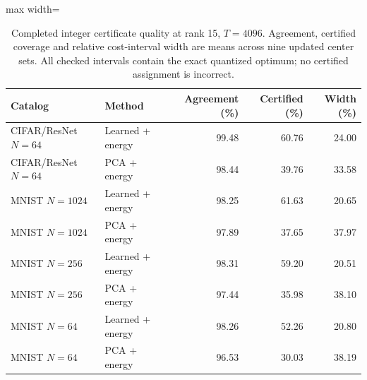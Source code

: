 \begin{table}[tp]
\caption{Completed integer certificate quality at rank 15, $T=4096$. Agreement, certified coverage and relative cost-interval width are means across nine updated center sets. All checked intervals contain the exact quantized optimum; no certified assignment is incorrect.}\label{tab:matched-certificate-quality}
\centering\small
\begin{adjustbox}{max width=\textwidth}
\begin{tabular}{@{}llrrr@{}}
\toprule
Catalog & Method & Agreement (\%) & Certified (\%) & Width (\%) \\
\midrule
CIFAR/ResNet $N=64$ & Learned + energy & 99.48 & 60.76 & 24.00 \\
CIFAR/ResNet $N=64$ & PCA + energy & 98.44 & 39.76 & 33.58 \\
MNIST $N=1024$ & Learned + energy & 98.25 & 61.63 & 20.65 \\
MNIST $N=1024$ & PCA + energy & 97.89 & 37.65 & 37.97 \\
MNIST $N=256$ & Learned + energy & 98.31 & 59.20 & 20.51 \\
MNIST $N=256$ & PCA + energy & 97.44 & 35.98 & 38.10 \\
MNIST $N=64$ & Learned + energy & 98.26 & 52.26 & 20.80 \\
MNIST $N=64$ & PCA + energy & 96.53 & 30.03 & 38.19 \\
\bottomrule
\end{tabular}
\end{adjustbox}
\end{table}
